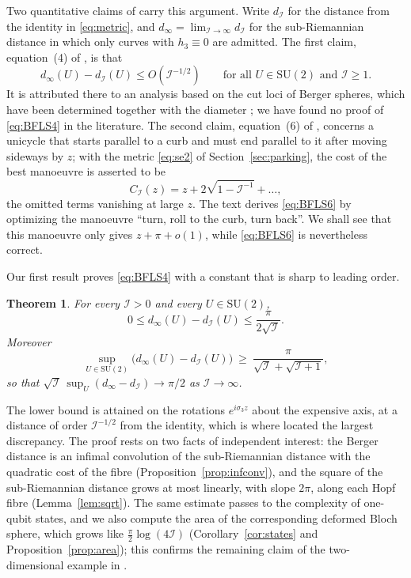\documentclass[11pt]{amsart}
\newtheorem{mainthm}{Theorem}
\theoremstyle{definition}
\newcommand{\I}{\mathcal{I}}
\newcommand{\SU}{\mathrm{SU}(2)}
\newcommand{\dinf}{d_{\infty}}
\begin{document}
Two quantitative claims of \cite{BFLS23} carry this argument. Write $d_\I$ for the distance from the identity in \eqref{eq:metric}, and $\dinf=\lim_{\I\to\infty}d_\I$ for the sub-Riemannian distance in which only curves with $h_3\equiv0$ are admitted. The first claim, equation~(4) of \cite{BFLS23}, is that
\begin{equation}\label{eq:BFLS4}
\dinf(U)-d_\I(U)\le O(\I^{-1/2})\qquad\text{for all }U\in\SU\text{ and }\I\ge1 .
\end{equation}
It is attributed there to an analysis based on the cut loci of Berger spheres, which have been determined together with the diameter \cite{Pod18}; we have found no proof of \eqref{eq:BFLS4} in the literature. The second claim, equation~(6) of \cite{BFLS23}, concerns a unicycle that starts parallel to a curb and must end parallel to it after moving sideways by $z$; with the metric \eqref{eq:se2} of Section~\ref{sec:parking}, the cost of the best manoeuvre is asserted to be
\begin{equation}\label{eq:BFLS6}
C_\I(z)=z+2\sqrt{1-\I^{-1}}+\dots,
\end{equation}
the omitted terms vanishing at large $z$. The text derives \eqref{eq:BFLS6} by optimizing the manoeuvre ``turn, roll to the curb, turn back''. We shall see that this manoeuvre only gives $z+\pi+o(1)$, while \eqref{eq:BFLS6} is nevertheless correct.

Our first result proves \eqref{eq:BFLS4} with a constant that is sharp to leading order.

\begin{mainthm}\label{thm:A}
For every $\I>0$ and every $U\in\SU$,
\[
0\le \dinf(U)-d_\I(U)\le \frac{\pi}{2\sqrt{\I}} .
\]
Moreover
\[
\sup_{U\in\SU}\bigl(\dinf(U)-d_\I(U)\bigr)\ \ge\ \frac{\pi}{\sqrt{\I}+\sqrt{\I+1}},
\]
so that $\sqrt{\I}\,\sup_U(\dinf-d_\I)\to\pi/2$ as $\I\to\infty$.
\end{mainthm}

The lower bound is attained on the rotations $e^{i\sigma_3 z}$ about the expensive axis, at a distance of order $\I^{-1/2}$ from the identity, which is where \cite{BFLS23} located the largest discrepancy. The proof rests on two facts of independent interest: the Berger distance is an infimal convolution of the sub-Riemannian distance with the quadratic cost of the fibre (Proposition~\ref{prop:infconv}), and the square of the sub-Riemannian distance grows at most linearly, with slope $2\pi$, along each Hopf fibre (Lemma~\ref{lem:sqrt}). The same estimate passes to the complexity of one-qubit states, and we also compute the area of the corresponding deformed Bloch sphere, which grows like $\tfrac{\pi}{2}\log(4\I)$ (Corollary~\ref{cor:states} and Proposition~\ref{prop:area}); this confirms the remaining claim of the two-dimensional example in \cite{BFLS23}.
\end{document}
